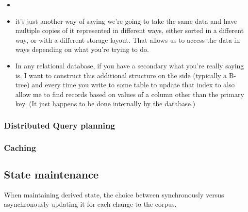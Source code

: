 \begin{itemize}
  \item
  \item it’s just another way of saying we’re going to take the same data and have multiple
  copies of it represented in different ways, either sorted in a different way, or with a different
  storage layout.  That allows us to access the data in ways depending on what you’re trying to do. 
  \item In any relational database, if you have a secondary what you’re really saying is,
  I want to construct this additional structure on the side (typically a B-tree) and every time you write to some table to update
  that index to also allow me to find records based on values of a column other than the primary key.
  (It just happens to be done internally by the database.)

\end{itemize}
\subsubsection{Distributed Query planning}

\subsubsection{Caching}

\subsection{State maintenance}
When maintaining derived state, the choice between synchronously versus
asynchronously updating it for each change to the corpus.

